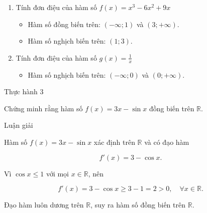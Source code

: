 \documentclass[
]{article}
\providecommand{\tightlist}{%
  \setlength{\itemsep}{0pt}\setlength{\parskip}{0pt}}\usepackage{longtable,booktabs,array}
\begin{document}
\begin{enumerate}
\def\labelenumi{\alph{enumi}.}
\tightlist
\item
  Tính đơn điệu của hàm số \(f(x)=x^3-6x^2+9x\)

  \begin{itemize}
  \tightlist
  \item
    Hàm số đồng biến trên: \((-\infty;1)\) và \((3;+\infty)\).
  \item
    Hàm số nghịch biến trên: \((1;3)\).
  \end{itemize}
\item
  Tính đơn điệu của hàm số \(g(x)=\frac{1}{x}\)

  \begin{itemize}
  \tightlist
  \item
    Hàm số nghịch biến trên: \((-\infty;0)\) và \((0;+\infty)\).
  \end{itemize}
\end{enumerate}

Thực hành 3

Chứng minh rằng hàm số \(f(x)=3x-\sin x\) đồng biến trên \(\mathbb{R}\).

Luận giải

Hàm số \(f(x) = 3x - \sin x\) xác định trên \(\mathbb{R}\) và có đạo hàm

\[
    f'(x) = 3 - \cos x.
\]

Vì \(\cos x \le 1\) với mọi \(x \in \mathbb{R}\), nên

\[
    f'(x) = 3 - \cos x \ge 3 - 1 = 2 > 0, \quad \forall x \in \mathbb{R}.
\]

Đạo hàm luôn dương trên \(\mathbb{R}\), suy ra hàm số đồng biến trên
\(\mathbb{R}\).
\end{document}
